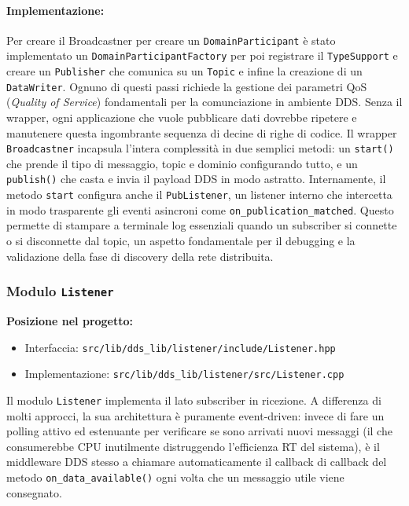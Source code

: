 \paragraph{Implementazione:}
Per creare il Broadcastner per creare  un \texttt{DomainParticipant} è stato implementato un \texttt{DomainParticipantFactory} per poi registrare il \texttt{TypeSupport} e creare un \texttt{Publisher} che comunica su un \texttt{Topic} e infine la creazione di un \texttt{DataWriter}. Ognuno di questi passi richiede la gestione dei parametri QoS (\textit{Quality of Service}) fondamentali per la comunciazione in ambiente DDS. Senza il wrapper, ogni applicazione che vuole pubblicare dati dovrebbe ripetere e manutenere questa ingombrante sequenza di decine di righe di codice. Il wrapper \texttt{Broadcastner} incapsula l'intera complessità in due semplici metodi: un \texttt{start()} che prende il tipo di messaggio, topic e dominio configurando tutto, e un \texttt{publish()} che casta e invia il payload DDS in modo astratto. Internamente, il metodo \texttt{start} configura anche il \texttt{PubListener}, un listener interno che intercetta in modo trasparente gli eventi asincroni come \texttt{on\_publication\_matched}. Questo permette di stampare a terminale log essenziali quando un subscriber si connette o si disconnette dal topic, un aspetto fondamentale per il debugging e la validazione della fase di discovery della rete distribuita.
\clearpage
\subsubsection{Modulo \texttt{Listener}}
\label{sec:lib_listener}

\noindent\textbf{Posizione nel progetto:}
\begin{itemize}
	\item Interfaccia: \texttt{src/lib/dds\_lib/listener/include/Listener.hpp}
	\item Implementazione: \texttt{src/lib/dds\_lib/listener/src/Listener.cpp}
\end{itemize}

Il modulo \texttt{Listener} implementa il lato subscriber in ricezione. A differenza di molti approcci, la sua architettura è puramente event-driven: invece di fare un polling attivo ed estenuante per verificare se sono arrivati nuovi messaggi (il che consumerebbe CPU inutilmente distruggendo l'efficienza RT del sistema), è il middleware DDS stesso a chiamare automaticamente il callback di callback del metodo \texttt{on\_data\_available()} ogni volta che un messaggio utile viene consegnato.

